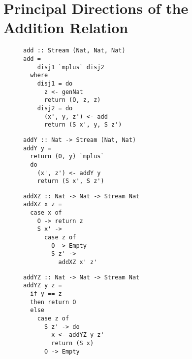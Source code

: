 \appendix

\section{Principal Directions of the Addition Relation}

\begin{figure}[!t]
  \centering
  \begin{minipage}{\columnwidth}
    \begin{lstlisting}[label={add_all}, caption={Function for \lstinline{addo out out out} direction}, captionpos=b, frame=tb]
add :: Stream (Nat, Nat, Nat)
add =
    disj1 `mplus` disj2
  where
    disj1 = do
      z <- genNat
      return (O, z, z)
    disj2 = do
      (x', y, z') <- add
      return (S x', y, S z')
    \end{lstlisting}
  \end{minipage}
\end{figure}

\begin{figure}[!t]
  \centering
  \begin{minipage}{\columnwidth}
    \begin{lstlisting}[label={add_y}, caption={Function for \lstinline{addo out in out} direction}, captionpos=b, frame=tb]
addY :: Nat -> Stream (Nat, Nat)
addY y =
  return (O, y) `mplus`
  do
    (x', z') <- addY y
    return (S x', S z')
    \end{lstlisting}
  \end{minipage}
\end{figure}

\begin{figure}[!t]
  \centering
  \begin{minipage}{\columnwidth}
    \begin{lstlisting}[label={add_x_z}, caption={Function for \lstinline{addo in out in} direction}, captionpos=b, frame=tb]
addXZ :: Nat -> Nat -> Stream Nat
addXZ x z =
  case x of
    O -> return z
    S x' ->
      case z of
        O -> Empty
        S z' ->
          addXZ x' z'
    \end{lstlisting}
  \end{minipage}
\end{figure}

\begin{figure}[!t]
  \centering
  \begin{minipage}{\columnwidth}
    \begin{lstlisting}[label={add_y_z}, caption={Function for \lstinline{addo out in in} direction}, captionpos=b, frame=tb]
addYZ :: Nat -> Nat -> Stream Nat
addYZ y z =
  if y == z
  then return O
  else
    case z of
      S z' -> do
        x <- addYZ y z'
        return (S x)
      O -> Empty
    \end{lstlisting}
  \end{minipage}
\end{figure}